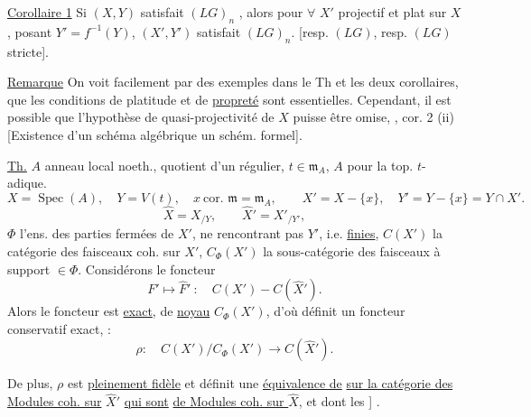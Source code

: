 \uline{Corollaire 1} 
 Si $(X,Y)$ satisfait $(LG)_n$
,
alors pour $\forall$ $X'$ projectif et plat sur $X$,
posant  $Y'=f^{-1}(Y)$,
$(X',Y')$ satisfait $(LG)_n$.
[resp. $(LG)$, resp. $(LG)$ stricte].


\uline{Remarque} On voit facilement par des exemples
dans le Th et les deux corollaires, que
les conditions de platitude et de \uline{propreté}
sont essentielles. Cependant, il  est
possible que l'hypothèse de quasi-projectivité de
$X$ 
puisse être omise, ,
cor. 2 (ii) [Existence d'un schéma
algébrique  un schém. formel].


\uline{Th.} $A$ anneau local noeth., quotient d'un régulier,
$t\in\mathfrak m_A$, $A$  pour la top. $t$-adique.
\[
X=\operatorname{Spec}(A),\quad Y=V(t),\quad x\ \text{cor. }\mathfrak m=\mathfrak m_A,
\qquad X'=X-\{x\},\quad Y'=Y-\{x\}=Y\cap X'.
\]
\[
\hat X=X_{/Y},\qquad \hat X'=X'_{/Y'},
\]
$\Phi$ l'ens. des parties fermées de $X'$,
ne rencontrant pas $Y'$, i.e. \uline{finies},
$C(X')$ la catégorie des faisceaux coh. sur $X'$,
$C_\Phi(X')$ la sous-catégorie des faisceaux à support $\in\Phi$.
Considérons le foncteur 
\[
F'\longmapsto\hat F'\ :\quad C(X')\mathbin{-}C(\hat X').
\]
Alors le foncteur est \uline{exact}, de \uline{noyau} $C_\Phi(X')$,
d'où définit un foncteur conservatif exact, : 
\[
\rho:\quad C(X')/C_\Phi(X')\longrightarrow C(\hat X').
\]
\unsure{]}

De plus, $\rho$ est \uline{pleinement fidèle}
 et
définit une \uline{équivalence de}
\uline{sur la catégorie des Modules coh. sur} $\hat X'$
\uline{qui sont} 
\uline{de Modules coh. sur $\hat X$}, et
dont les 
]
.


